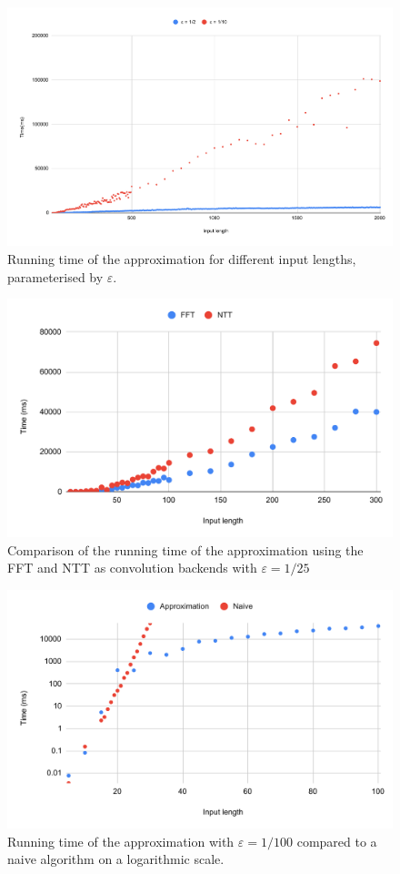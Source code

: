 \begin{figure}[h!]
    \centering
    \includegraphics[width=\linewidth]{charts/input_length.pdf}
    \caption{Running time of the approximation for different input lengths, parameterised by $\varepsilon$.}
    \label{fig:chart}
\end{figure}

\begin{figure}[h!]
    \centering
    \includegraphics[width=\linewidth]{charts/fft_ntt.pdf}
    \caption{Comparison of the running time of the approximation using the FFT and NTT as convolution backends with $\varepsilon = 1/25$  }
    \label{fig:chart}
\end{figure}

\begin{figure}[h!]
    \centering
    \includegraphics[width=\linewidth]{charts/naive.pdf}
    \caption{Running time of the approximation with $\varepsilon = 1/100$ compared to a naive algorithm on a logarithmic scale.}
    \label{fig:chart}
\end{figure}


